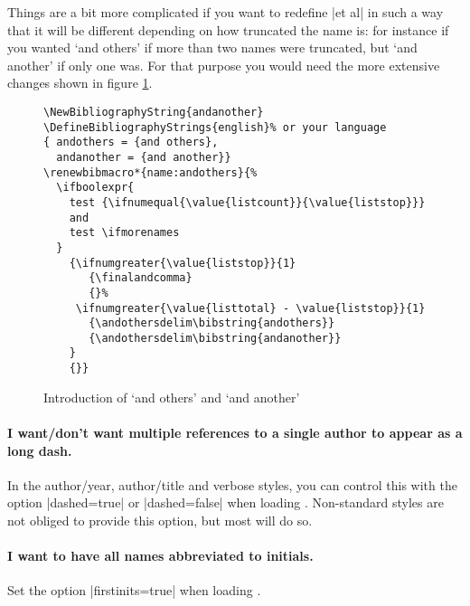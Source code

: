Things are a bit more complicated if you want to redefine |et al| in
such a way that it will be different depending on how truncated the
name is: for instance if you wanted `and others' if more than two
names were truncated, but `and another' if only one was. For that
purpose you would need the more extensive changes shown in figure
\ref{andothers}.
\begin{figure}
\begin{Verbatim}[frame=single]
\NewBibliographyString{andanother}
\DefineBibliographyStrings{english}% or your language
{ andothers = {and others},
  andanother = {and another}}
\renewbibmacro*{name:andothers}{%
  \ifboolexpr{
    test {\ifnumequal{\value{listcount}}{\value{liststop}}}
    and
    test \ifmorenames
  }
    {\ifnumgreater{\value{liststop}}{1}
       {\finalandcomma}
       {}%
     \ifnumgreater{\value{listtotal} - \value{liststop}}{1}
       {\andothersdelim\bibstring{andothers}}
       {\andothersdelim\bibstring{andanother}}
    }
    {}}
\end{Verbatim}
\caption{Introduction of `and others' and `and another'\label{andothers}}
\end{figure}

\paragraph{I want/don't want multiple references to a single author to
  appear as a long dash.} In the author/year, author/title and verbose
styles, you can control this with the option |dashed=true| or
|dashed=false| when loading \biblatex. Non-standard styles are not
obliged to provide this option, but most will do so.

\paragraph{I want to have all names abbreviated to initials.} Set the
option |firstinits=true| when loading \biblatex.

